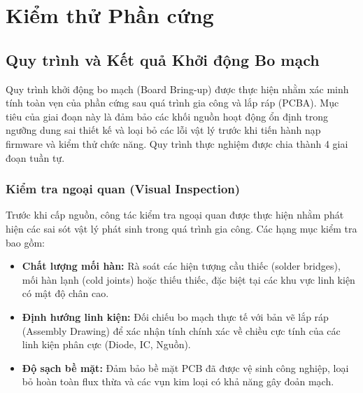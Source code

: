 \section{Kiểm thử Phần cứng}

    \subsection{Quy trình và Kết quả Khởi động Bo mạch}

        Quy trình khởi động bo mạch (Board Bring-up) được thực hiện nhằm xác minh tính toàn vẹn của phần cứng sau quá trình gia công và lắp ráp (PCBA). Mục tiêu của giai đoạn này là đảm bảo các khối nguồn hoạt động ổn định trong ngưỡng dung sai thiết kế và loại bỏ các lỗi vật lý trước khi tiến hành nạp firmware và kiểm thử chức năng. Quy trình thực nghiệm được chia thành 4 giai đoạn tuần tự.

        \subsubsection{Kiểm tra ngoại quan (Visual Inspection)}
            Trước khi cấp nguồn, công tác kiểm tra ngoại quan được thực hiện nhằm phát hiện các sai sót vật lý phát sinh trong quá trình gia công. Các hạng mục kiểm tra bao gồm:

            \begin{itemize}
                \item \textbf{Chất lượng mối hàn:} Rà soát các hiện tượng cầu thiếc (solder bridges), mối hàn lạnh (cold joints) hoặc thiếu thiếc, đặc biệt tại các khu vực linh kiện có mật độ chân cao.
                \item \textbf{Định hướng linh kiện:} Đối chiếu bo mạch thực tế với bản vẽ lắp ráp (Assembly Drawing) để xác nhận tính chính xác về chiều cực tính của các linh kiện phân cực (Diode, IC, Nguồn).
                \item \textbf{Độ sạch bề mặt:} Đảm bảo bề mặt PCB đã được vệ sinh công nghiệp, loại bỏ hoàn toàn flux thừa và các vụn kim loại có khả năng gây đoản mạch.
            \end{itemize}

